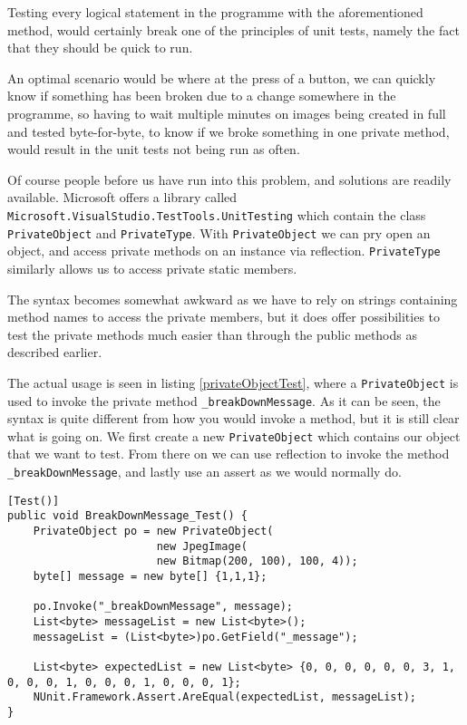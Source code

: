 Testing every logical statement in the programme with the aforementioned method, would certainly break one of the principles of unit tests, namely the fact that they should be quick to run.

An optimal scenario would be where at the press of a button, we can quickly know if something has been broken due to a change somewhere in the programme, so having to wait multiple minutes on images being created in full and tested byte-for-byte, to know if we broke something in one private method, would result in the unit tests not being run as often. 

Of course people before us have run into this problem, and solutions are readily available.
Microsoft offers a library called \lstinline|Microsoft.VisualStudio.TestTools.UnitTesting| which contain the class \lstinline|PrivateObject| and \lstinline|PrivateType|.
With \lstinline|PrivateObject| we can pry open an object, and access private methods on an instance via reflection. \lstinline|PrivateType| similarly allows us to access private static members. 

The syntax becomes somewhat awkward as we have to rely on strings containing method names to access the private members, but it does offer possibilities to test the private methods much easier than through the public methods as described earlier.

The actual usage is seen in listing \ref{privateObjectTest}, where a \lstinline|PrivateObject| is used to invoke the private method \lstinline|_breakDownMessage|. As it can be seen, the syntax is quite different from how you would invoke a method, but it is still clear what is going on. We first create a new \lstinline|PrivateObject| which contains our object that we want to test.  From there on we can use reflection to invoke the method \lstinline|_breakDownMessage|, and lastly use an assert as we would normally do.

\begin{lstlisting}[firstnumber=23,label=privateObjectTest,caption={Example usage of the \lstinline|PrivateObject| class \textbf{File: }JPEGImageTests.cs}]
[Test()]
public void BreakDownMessage_Test() {
	PrivateObject po = new PrivateObject(
		               new JpegImage(
		               new Bitmap(200, 100), 100, 4));
	byte[] message = new byte[] {1,1,1};

	po.Invoke("_breakDownMessage", message);
	List<byte> messageList = new List<byte>();
	messageList = (List<byte>)po.GetField("_message");

	List<byte> expectedList = new List<byte> {0, 0, 0, 0, 0, 0, 3, 1, 0, 0, 0, 1, 0, 0, 0, 1, 0, 0, 0, 1};
	NUnit.Framework.Assert.AreEqual(expectedList, messageList);
}
\end{lstlisting}

